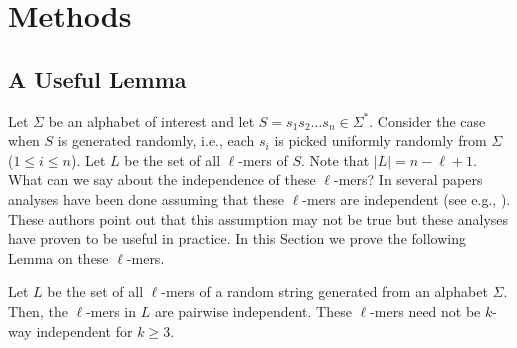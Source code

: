 \section{Methods}
\subsection{A Useful Lemma}

Let $\Sigma$ be an alphabet of interest and let $S=s_1s_2\ldots s_n\in
\Sigma^*$. Consider the case when $S$ is generated randomly, i.e., each $s_i$ is
picked uniformly randomly from $\Sigma$ ($1\leq i\leq n$). Let $L$ be the set of
all $\ell$-mers of $S$. Note that $|L|=n-\ell+1$. What can we say about the
independence of these $\ell$-mers? In several papers analyses have been done
assuming that these $\ell$-mers are independent (see e.g., \cite{BuTo01}). These authors point out that
this assumption may not be true but these analyses have proven to be useful in
practice. In this Section we prove the following Lemma on these $\ell$-mers.

\begin{lemma}\label{rslemma} Let $L$ be the set of all $\ell$-mers of a random
string generated from an alphabet $\Sigma$. Then, the $\ell$-mers in $L$ are
pairwise independent. These $\ell$-mers need not be $k$-way independent for
$k\geq 3$.  \end{lemma}

